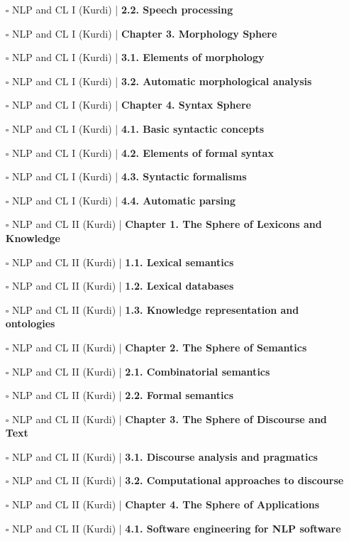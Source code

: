 \documentclass[a4, landscape, 12pt]{article}
\newcommand{\checkbox}{$\square$}%
\begin{document}
\begin{itemize}
{}
\item [\checkbox]  NLP and CL I (Kurdi) | \textbf{ 2.2. Speech processing
}
\item [\checkbox]  NLP and CL I (Kurdi) | \textbf{ Chapter 3. Morphology Sphere
}
\item [\checkbox]  NLP and CL I (Kurdi) | \textbf{ 3.1. Elements of morphology
}
\item [\checkbox]  NLP and CL I (Kurdi) | \textbf{ 3.2. Automatic morphological analysis
}
\item [\checkbox]  NLP and CL I (Kurdi) | \textbf{ Chapter 4. Syntax Sphere
}
\item [\checkbox]  NLP and CL I (Kurdi) | \textbf{ 4.1. Basic syntactic concepts
}
\item [\checkbox]  NLP and CL I (Kurdi) | \textbf{ 4.2. Elements of formal syntax
}
\item [\checkbox]  NLP and CL I (Kurdi) | \textbf{ 4.3. Syntactic formalisms
}
\item [\checkbox]  NLP and CL I (Kurdi) | \textbf{ 4.4. Automatic parsing
}
\item [\checkbox]  NLP and CL II (Kurdi) | \textbf{ Chapter 1. The Sphere of Lexicons and Knowledge
}
\item [\checkbox]  NLP and CL II (Kurdi) | \textbf{ 1.1. Lexical semantics
}
\item [\checkbox]  NLP and CL II (Kurdi) | \textbf{ 1.2. Lexical databases
}
\item [\checkbox]  NLP and CL II (Kurdi) | \textbf{ 1.3. Knowledge representation and ontologies
}
\item [\checkbox]  NLP and CL II (Kurdi) | \textbf{ Chapter 2. The Sphere of Semantics
}
\item [\checkbox]  NLP and CL II (Kurdi) | \textbf{ 2.1. Combinatorial semantics
}
\item [\checkbox]  NLP and CL II (Kurdi) | \textbf{ 2.2. Formal semantics
}
\item [\checkbox]  NLP and CL II (Kurdi) | \textbf{ Chapter 3. The Sphere of Discourse and Text
}
\item [\checkbox]  NLP and CL II (Kurdi) | \textbf{ 3.1. Discourse analysis and pragmatics
}
\item [\checkbox]  NLP and CL II (Kurdi) | \textbf{ 3.2. Computational approaches to discourse
}
\item [\checkbox]  NLP and CL II (Kurdi) | \textbf{ Chapter 4. The Sphere of Applications
}
\item [\checkbox]  NLP and CL II (Kurdi) | \textbf{ 4.1. Software engineering for NLP software
}
\end{itemize}
\end{document}
